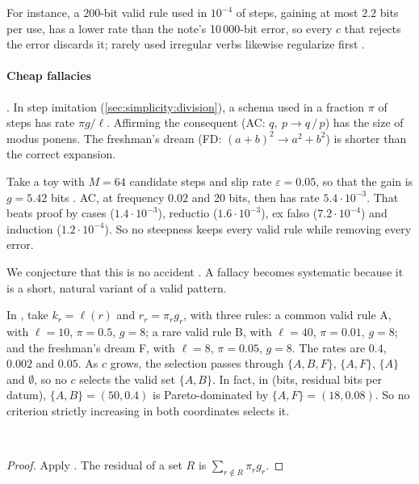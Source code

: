 For instance, a 200-bit valid rule used in $10^{-4}$ of steps, gaining at most $2.2$ bits per use, has a lower rate than the note's 10\,000-bit error, so every $c$ that rejects the error discards it; rarely used irregular verbs likewise regularize first \citep{lieberman2007quantifying}.

\paragraph{Cheap fallacies} . In step imitation (\cref{sec:simplicity:division}), a schema used in a fraction $\pi$ of steps has rate $\pi g/\ell$. Affirming the consequent (AC: $q,\ p\to q\,/\,p$) has the size of modus ponens. The freshman's dream (FD: $(a+b)^2\to a^2+b^2$) is shorter than the correct expansion.

Take a toy with $M=64$ candidate steps and slip rate $\varepsilon=0.05$, so that the gain is $g=5.42$ bits . AC, at frequency $0.02$ and 20 bits, then has rate $5.4\cdot10^{-3}$. That beats proof by cases ($1.4\cdot10^{-3}$), reductio ($1.6\cdot10^{-3}$), ex falso ($7.2\cdot10^{-4}$) and induction ($1.2\cdot10^{-4}$). So no steepness keeps every valid rule while removing every error.

We conjecture that this is no accident . A fallacy becomes systematic because it is a short, natural variant of a valid pattern.

\begin{proposition}\label{prop:simplicity:inversion}
In , take $k_r=\ell(r)$ and $r_r=\pi_rg_r$, with three rules: a common valid rule A, with $\ell=10$, $\pi=0.5$, $g=8$; a rare valid rule B, with $\ell=40$, $\pi=0.01$, $g=8$; and the freshman's dream F, with $\ell=8$, $\pi=0.05$, $g=8$. The rates are $0.4$, $0.002$ and $0.05$. As $c$ grows, the selection passes through $\{A,B,F\}$, $\{A,F\}$, $\{A\}$ and $\emptyset$, so no $c$ selects the valid set $\{A,B\}$. In fact, in (bits, residual bits per datum), $\{A,B\}=(50,0.4)$ is Pareto-dominated by $\{A,F\}=(18,0.08)$. So no criterion strictly increasing in both coordinates selects it.

\hfill{}\ 
\end{proposition}

\begin{proof}
Apply . The residual of a set $R$ is $\sum_{r\notin R}\pi_rg_r$.
\end{proof}

